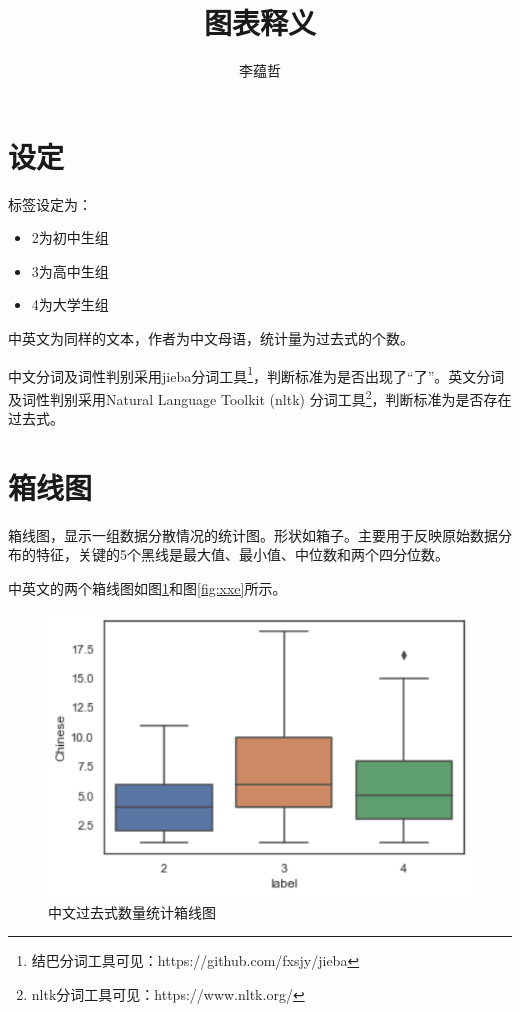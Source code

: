 \documentclass[]{article}
\title{图表释义}
\author{李蕴哲}
\begin{document}
\maketitle



\section{设定}

标签设定为：

\begin{itemize}
	\item 2为初中生组
	\item 3为高中生组
	\item 4为大学生组
\end{itemize}

中英文为同样的文本，作者为中文母语，统计量为过去式的个数。

中文分词及词性判别采用jieba分词工具\footnote{结巴分词工具可见：https://github.com/fxsjy/jieba}，判断标准为是否出现了“了”。英文分词及词性判别采用Natural Language Toolkit (nltk) 分词工具\footnote{nltk分词工具可见：https://www.nltk.org/}，判断标准为是否存在过去式。

\section{箱线图}

箱线图，显示一组数据分散情况的统计图。形状如箱子。主要用于反映原始数据分布的特征，关键的5个黑线是最大值、最小值、中位数和两个四分位数。

中英文的两个箱线图如图\ref{fig:xxc}和图\ref{fig:xxe}所示。

\begin{figure}
	\centering
	\includegraphics[width=0.7\linewidth]{fig/xxc}
	\caption{中文过去式数量统计箱线图}
	\label{fig:xxc}
\end{figure}
\end{document}

